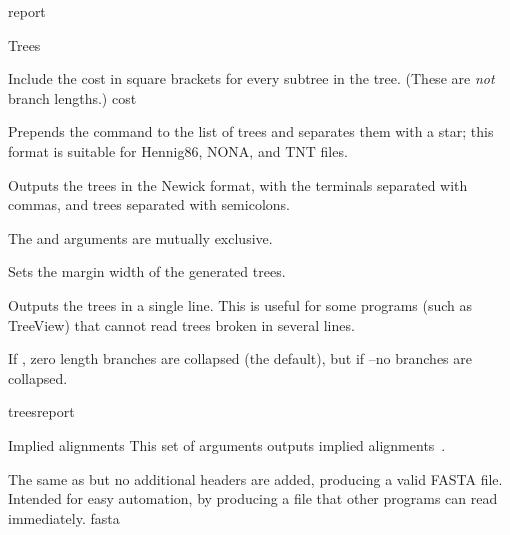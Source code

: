 \begin{command}{report}{}
\begin{arguments}
\begin{argumentgroup}{Trees}
{\begin{description}
                        {Include the cost in square brackets for every subtree in the tree. (These 
                        are \emph{not} branch lengths.)}
                        {cost}

                        {Prepends the  command to the list of
                        trees and separates them with a star; this format is
                        suitable for Hennig86, NONA, and TNT files.}
                        {}
                        
                        {Outputs the trees in the Newick format, with the
                        terminals separated with commas, and trees separated
                        with semicolons.}
                        {}
	    \begin{statement}
	     The  and  arguments are 
	     mutually exclusive.
	     \end{statement}
	     
                        {Sets the margin width of the generated trees.}
                        {}

                        {Outputs the trees in a single line. This is useful for
                        some programs (such as TreeView) that cannot read
                        trees broken in several
                        lines.}
                        {}

                        {If , zero length branches are collapsed (the
                        default), but if --no branches are
                        collapsed.}
                        {}
                    \end{description}}
                {treesreport}

		\end{argumentgroup}

		\begin{argumentgroup}{Implied alignments}
            {This set of arguments outputs implied alignments~\cite{wheeler2003}.} 

            {The same as  but no additional headers
                are added, producing a valid FASTA file. Intended for easy
                automation, by producing a file that other programs can read
                immediately.}
                {fasta}


\end{argumentgroup}
\end{arguments}
\end{command}
